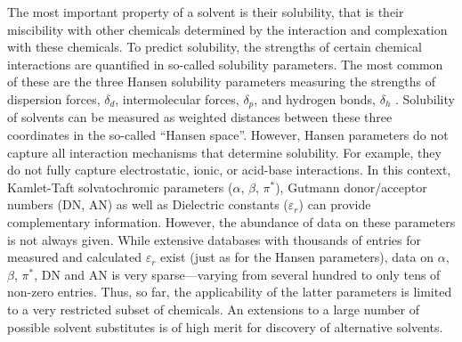 \documentclass[
  english,        %
  font=times,     %
  onecolumn,      %
]{article}
\begin{document}
The most important property of a solvent is their solubility, that is their miscibility with other chemicals determined by the interaction and complexation with these chemicals\cite{wintertonGreenSolventCritical2021}. To predict solubility, the strengths of certain chemical interactions are quantified in so-called solubility parameters\cite{bartonSolubilityParameters1975,vandykSolubilitySolvencySolubility1985,fernandesApplicationHansenSolubility2025}. The most common of these are the three Hansen solubility parameters measuring the strengths of dispersion forces, $\delta_d$, intermolecular forces, $\delta_p$, and hydrogen bonds, $\delta_h$ \cite{hansenHansenSolubilityParameters2007}. Solubility of solvents can be measured as weighted distances between these three coordinates in the so-called “Hansen space”. However, Hansen parameters do not capture all interaction mechanisms that determine solubility\cite{fernandesApplicationHansenSolubility2025}. For example, they do not fully capture electrostatic, ionic, or acid-base interactions\cite{louwerseRevisitingHansenSolubility2017,lanComparingCorrelatingSolubility2014}.  In this context, Kamlet-Taft solvatochromic parameters  ($\alpha$, $\beta$, $\pi^*$)\cite{kamletLinearSolvationEnergy1983}, Gutmann donor/acceptor numbers (DN, AN)\cite{gutmannEmpiricalParametersDonor1976} as well as Dielectric constants ($\varepsilon_r$) can provide complementary information\cite{lanComparingCorrelatingSolubility2014,podapangiGreenSolventsMaterials2023}. However, the abundance of data on these parameters is not always given. While extensive databases with thousands of entries for measured and calculated $\varepsilon_r$ exist (just as for the Hansen parameters\cite{hansenHansenSolubilityParameters2007}), data on $\alpha$, $\beta$, $\pi^*$, DN and AN is very sparse---varying from several hundred to only tens of non-zero entries\cite{StenutzChemTables}. Thus, so far, the applicability of the latter parameters is limited to a very restricted subset of chemicals. An extensions to a large number of possible solvent substitutes is of high merit for discovery of alternative solvents.
\end{document}
